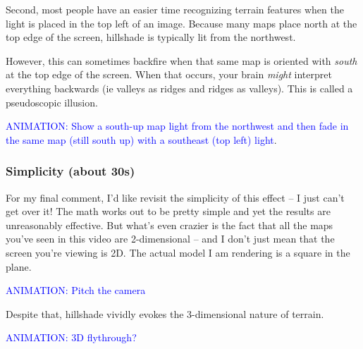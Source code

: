 \documentclass{article}
\newcommand\animation[1]{\textcolor{blue}{ANIMATION: #1}}
\begin{document}
Second, most people have an easier time recognizing terrain features when the light is placed in the top left of an image.
Because many maps place north at the top edge of the screen, hillshade is typically lit from the northwest.

However, this can sometimes backfire when that same map is oriented with \textit{south} at the top edge of the screen.
When that occurs, your brain \textit{might} interpret everything backwards (ie valleys as ridges and ridges as valleys).
This is called a pseudoscopic illusion.

\animation{Show a south-up map light from the northwest and then fade in the same map (still south up) with a southeast (top left) light}.

\subsubsection{Simplicity (about 30s)}

For my final comment, I'd like revisit the simplicity of this effect -- I just can't get over it!
The math works out to be pretty simple and yet the results are unreasonably effective.
But what's even crazier is the fact that all the maps you've seen in this video are 2-dimensional -- and I don't just mean that the screen you're viewing is 2D.
The actual model I am rendering is a square in the plane.

\animation{Pitch the camera}

Despite that, hillshade vividly evokes the 3-dimensional nature of terrain.

\animation{3D flythrough?}
\end{document}
